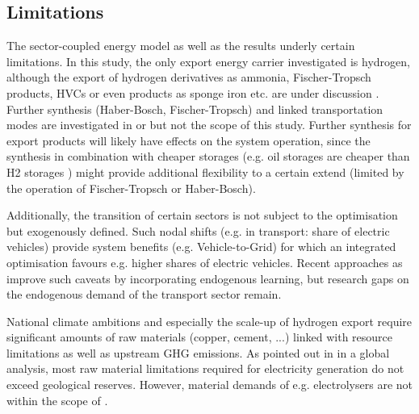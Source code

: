 \subsection{Limitations}
\label{subsec:limitations}

The sector-coupled energy model as well as the results underly certain limitations. In this study, the only export energy carrier investigated is hydrogen, although the export of hydrogen derivatives as ammonia, Fischer-Tropsch products, HVCs or even products as sponge iron etc. are under discussion \cite{Verpoort2023}. Further synthesis (Haber-Bosch, Fischer-Tropsch) and linked transportation modes are investigated in \cite{Hampp2021} or \cite{Galimova2023} but not the scope of this study. Further synthesis for export products will likely have effects on the system operation, since the synthesis in combination with cheaper storages (e.g. oil storages are cheaper than H2 storages \cite{DEA2019TechnologyData}) might provide additional flexibility to a certain extend (limited by the operation of Fischer-Tropsch or Haber-Bosch).

Additionally, the transition of certain sectors is not subject to the optimisation but exogenously defined. Such nodal shifts (e.g. in transport: share of electric vehicles) provide system benefits (e.g. Vehicle-to-Grid) for which an integrated optimisation favours e.g. higher shares of electric vehicles.
Recent approaches as \cite{Zeyen2023} improve such caveats by incorporating endogenous learning, but research gaps on the endogenous demand of the transport sector remain.

National climate ambitions and especially the scale-up of hydrogen export require significant amounts of raw materials (copper, cement, ...) linked with resource limitations as well as upstream GHG emissions. As pointed out in \cite{Wang2023} in a global analysis, most raw material limitations required for electricity generation do not exceed geological reserves. However, material demands of e.g. electrolysers are not within the scope of \cite{Wang2023}.


